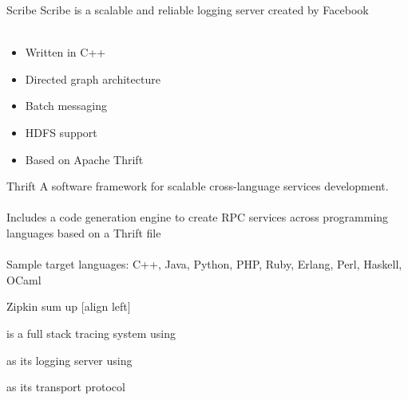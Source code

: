 \begin{frame}{Scribe}
Scribe is a scalable and reliable logging server created by Facebook
\hfill \\
\hfill \\
\begin{itemize}
\item Written in C++
\item Directed graph architecture
\item Batch messaging
\item HDFS support
\item Based on Apache Thrift
\end{itemize}
\end{frame}

\begin{frame}{Thrift}
A software framework for scalable cross-language services development.
\hfill \\
\hfill \\
Includes a code generation engine to create RPC services across programming
languages based on a Thrift file
\hfill \\
\hfill \\
Sample target languages: C++, Java, Python, PHP, Ruby, Erlang, Perl, Haskell,
OCaml
\end{frame}

\begin{frame}{Zipkin sum up}
[align left]
\begin{description} \itemsep15pt
\item[Zipkin] is a full stack tracing system using
\item[Scribe] as its logging server using
\item[Thrift] as its transport protocol
\end{description}
\end{frame}
